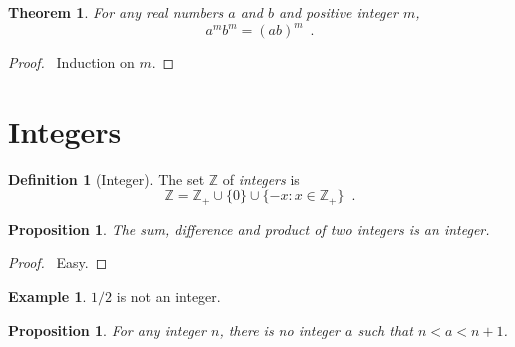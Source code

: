 \documentclass{book}
\let\qed\relax
\newtheorem{prop}[ax]{Proposition}
\newtheorem{thm}[ax]{Theorem}
\theoremstyle{definition}
\newtheorem{df}[ax]{Definition}
\newtheorem{ex}[ax]{Example}
\begin{document}
\begin{thm}
For any real numbers $a$ and $b$ and positive integer $m$,
\[ a^m b^m = (ab)^m \enspace . \]
\end{thm}

\begin{proof}
\pf\ Induction on $m$. \qed
\end{proof}

\section{Integers}

\begin{df}[Integer]
The set $\mathbb{Z}$ of \emph{integers} is
\[ \mathbb{Z} = \mathbb{Z}_+ \cup \{ 0 \} \cup \{ -x : x \in \mathbb{Z}_+\} \enspace . \]
\end{df}

\begin{prop}
The sum, difference and product of two integers is an integer.
\end{prop}

\begin{proof}
\pf\ Easy. \qed
\end{proof}

\begin{ex}
$1/2$ is not an integer.
\end{ex}

\begin{prop}
For any integer $n$, there is no integer $a$ such that $n < a < n+1$.
\end{prop}
\end{document}
